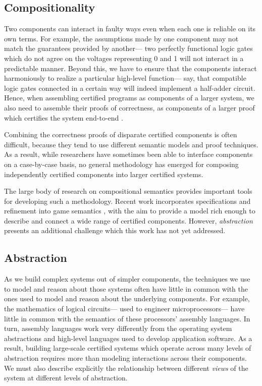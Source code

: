 \documentclass[sigplan,10pt,authordraft]{acmart}
\begin{document}
\subsection{Compositionality}

Two components can interact in faulty ways
even when each one is reliable on its own terms.
For example,
the assumptions made by one component
may not match the guarantees provided by another---%
two perfectly functional logic gates which do not agree
on the voltages representing 0 and 1
will not interact in a predictable manner.
Beyond this,
we have to ensure that the components
interact harmoniously
to realize a particular high-level function---%
say, that compatible logic gates
connected in a certain way will indeed
implement a half-adder circuit.
Hence, when assembling certified programs
as components of a larger system,
we also need to assemble their proofs of correctness,
as components of a larger proof
which certifies the system end-to-end \cite{deepspec}.


Combining the correctness proofs
of disparate certified components
is often difficult,
because they
tend to use different semantic models and proof techniques.
As a result,
while researchers have sometimes been able to interface
components on a case-by-case basis,
no general methodology has emerged
for composing independently certified components
into larger certified systems.

The large body of research on compositional semantics
provides important tools for developing such a methodology.
Recent work incorporates specifications and refinement
into game semantics \cite{rbgs-cal},
with the aim to provide a model rich enough
to describe and connect
a wide range of certified components.
However,
\emph{abstraction} presents an additional challenge
which this work has not yet addressed.

\subsection{Abstraction}

As we build complex systems out of simpler components,
the techniques we use to model and reason about those systems
often have little in common with
the ones used to model and reason about the underlying components.
For example,
the mathematics of logical circuits---%
used to engineer microprocessors---%
have little in common with
the semantics of these processors' assembly languages.
In turn, assembly languages work very differently from
the operating system abstractions and
high-level languages used to develop application software.
As a result,
building large-scale certified systems
which operate across many levels of abstraction
requires more than
modeling interactions across their components.
We must also describe explicitly
the relationship between
different \emph{views} of the system
at different levels of abstraction.
\end{document}
